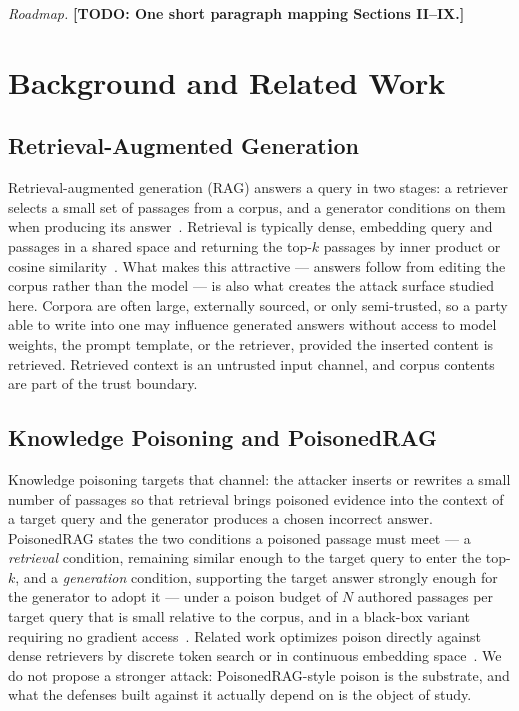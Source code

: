 \documentclass[conference]{IEEEtran}
\newcommand{\TODO}[1]{\textbf{[TODO: #1]}}
\begin{document}
\textit{Roadmap.}
\TODO{One short paragraph mapping Sections II--IX.}

\section{Background and Related Work}
\label{sec:background}

\subsection{Retrieval-Augmented Generation}
Retrieval-augmented generation (RAG) answers a query in two stages: a retriever
selects a small set of passages from a corpus, and a generator conditions on them
when producing its answer~\cite{lewis2020rag}. Retrieval is typically dense,
embedding query and passages in a shared space and returning the top-$k$ passages
by inner product or cosine similarity~\cite{karpukhin2020dpr,izacard2022contriever}.
What makes this attractive --- answers follow from editing the corpus rather than
the model --- is also what creates the attack surface studied here. Corpora are
often large, externally sourced, or only semi-trusted, so a party able to write
into one may influence generated answers without access to model weights, the
prompt template, or the retriever, provided the inserted content is retrieved.
Retrieved context is an untrusted input channel, and corpus contents are part of
the trust boundary.

\subsection{Knowledge Poisoning and PoisonedRAG}
Knowledge poisoning targets that channel: the attacker inserts or rewrites a small
number of passages so that retrieval brings poisoned evidence into the context of
a target query and the generator produces a chosen incorrect answer. PoisonedRAG
states the two conditions a poisoned passage must meet --- a \emph{retrieval}
condition, remaining similar enough to the target query to enter the top-$k$, and
a \emph{generation} condition, supporting the target answer strongly enough for
the generator to adopt it --- under a poison budget of $N$ authored passages per
target query that is small relative to the corpus, and in a black-box variant
requiring no gradient access~\cite{zou2025poisonedrag}. Related work optimizes
poison directly against dense retrievers by discrete token search or in
continuous embedding space~\cite{su2025aggd,li2025continuous}.
We do not propose a stronger attack: PoisonedRAG-style poison is the substrate,
and what the defenses built against it actually depend on is the object of study.
\end{document}
